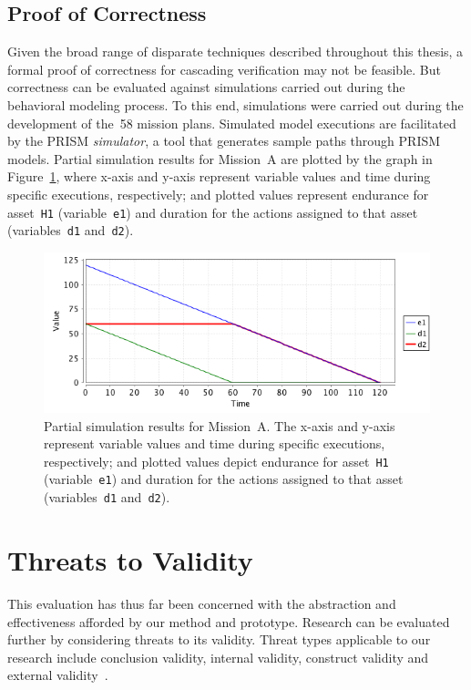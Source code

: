 \subsection{Proof of Correctness}

Given the broad range of disparate techniques described throughout this thesis, a formal proof of correctness for cascading verification may not be feasible. But correctness can be evaluated against simulations carried out during the behavioral modeling process. To this end, simulations were carried out during the development of the~58 mission plans. Simulated model executions are facilitated by the PRISM \emph{simulator}, a tool that generates sample paths through PRISM models. Partial simulation results for Mission~A are plotted by the graph in Figure~\ref{fig:mission_simulation}, where x-axis and y-axis represent variable values and time during specific executions, respectively; and plotted values represent endurance for asset~\texttt{H1} (variable~\texttt{e1}) and duration for the actions assigned to that asset (variables~\texttt{d1} and~\texttt{d2}).

\begin{figure}[ht]
\centering
\includegraphics[width=\textwidth]{img/mission-simulation.png}
\caption[Mission simulation]{Partial simulation results for Mission~A\@. The x-axis and y-axis represent variable values and time during specific executions, respectively; and plotted values depict endurance for asset~\texttt{H1} (variable~\texttt{e1}) and duration for the actions assigned to that asset (variables~\texttt{d1} and~\texttt{d2}).}
\label{fig:mission_simulation}
\end{figure}

\section{Threats to Validity}
\label{sec:Threats_to_Validity}

This evaluation has thus far been concerned with the abstraction and effectiveness afforded by our method and prototype. Research can be evaluated further by considering threats to its validity. Threat types applicable to our research include conclusion validity, internal validity, construct validity and external validity~\cite{Wright_2010,Feldt_2010}.

